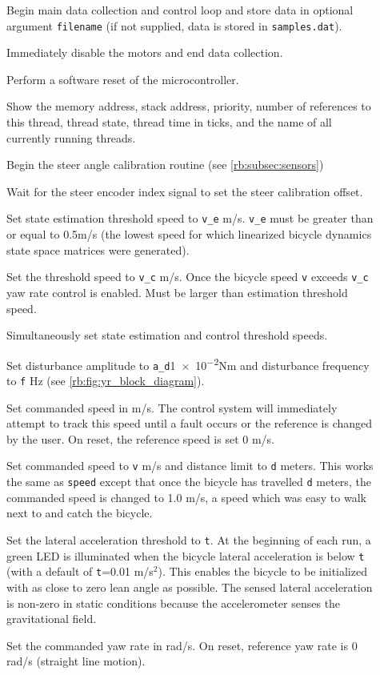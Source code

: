 \begin{description}
  \item[] Begin main data collection and control loop and store
    data in optional argument \verb|filename| (if not supplied, data is stored in
    \verb|samples.dat|).
  \item[] Immediately disable the motors and end data collection.
  \item[] Perform a software reset of the microcontroller.
  \item[] Show the memory address, stack address, priority, number
    of references to this thread, thread state, thread time in ticks, and the
    name of all currently running threads.
  \item[] Begin the steer angle calibration routine (see
    \autoref{rb:subsec:sensors})
  \item[] Wait for the steer encoder index signal to set the steer calibration offset.
  \item[] Set state estimation threshold speed to \verb|v_e| m/s.
    \verb|v_e| must be greater than or equal to 0.5m/s (the lowest speed
    for which linearized bicycle dynamics state space matrices were generated).
  \item[] Set the threshold speed to \verb|v_c| m/s. Once the
    bicycle speed \verb|v| exceeds \verb|v_c| yaw rate control is enabled. Must
    be larger than estimation threshold speed.
  \item[] Simultaneously set state estimation and control threshold speeds.
  \item[] Set disturbance amplitude to \verb|a_d|\num{1e-2}Nm
    and disturbance frequency to \verb|f| Hz (see
    \autoref{rb:fig:yr_block_diagram}).
  \item[] Set commanded speed in m/s. The control system will
    immediately attempt to track this speed until a fault occurs or the
    reference is changed by the user. On reset, the reference speed is set 0
    m/s.
  \item[] Set commanded speed to \verb|v| m/s and distance
    limit to \verb|d| meters. This works the same as \verb|speed| except that
    once the bicycle has travelled \verb|d| meters, the commanded speed is
    changed to 1.0 m/s, a speed which was easy to walk next to and catch the
    bicycle.
  \item[] Set the lateral acceleration threshold to \verb|t|. At
    the beginning of each run, a green LED is illuminated when the bicycle
    lateral acceleration is below \verb|t| (with a default of \verb|t|=0.01
    m/s$^2$). This enables the bicycle to be initialized with as close to zero
    lean angle as possible. The sensed lateral acceleration is non-zero in
    static conditions because the accelerometer senses the gravitational field.
  \item[] Set the commanded yaw rate in rad/s. On
    reset, reference yaw rate is 0 rad/s (straight line motion).

\end{description}


